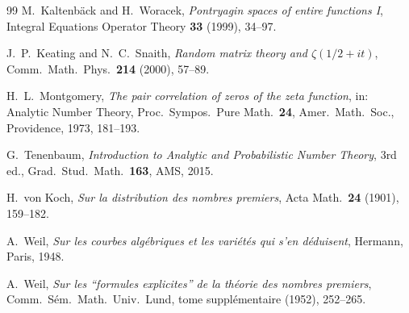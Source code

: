 \documentclass[11pt]{amsart}
\theoremstyle{definition}
\theoremstyle{remark}
\begin{document}
\begin{thebibliography}{99}
M.\ Kaltenb\"ack and H.\ Woracek,
\emph{Pontryagin spaces of entire functions I},
Integral Equations Operator Theory \textbf{33} (1999), 34--97.

J.~P.\ Keating and N.~C.\ Snaith,
\emph{Random matrix theory and $\zeta(1/2+it)$},
Comm.\ Math.\ Phys.\ \textbf{214} (2000), 57--89.

H.~L.\ Montgomery,
\emph{The pair correlation of zeros of the zeta function},
in: Analytic Number Theory, Proc.\ Sympos.\ Pure Math.\ \textbf{24}, Amer.\ Math.\ Soc.,
Providence, 1973, 181--193.

G.~Tenenbaum,
\emph{Introduction to Analytic and Probabilistic Number Theory},
3rd ed., Grad.\ Stud.\ Math.\ \textbf{163}, AMS, 2015.

H.\ von Koch,
\emph{Sur la distribution des nombres premiers},
Acta Math.\ \textbf{24} (1901), 159--182.

A.~Weil,
\emph{Sur les courbes alg\'ebriques et les vari\'et\'es qui s'en d\'eduisent},
Hermann, Paris, 1948.

A.~Weil,
\emph{Sur les ``formules explicites'' de la th\'eorie des nombres premiers},
Comm.\ S\'em.\ Math.\ Univ.\ Lund, tome suppl\'ementaire (1952), 252--265.

\end{thebibliography}
\end{document}
